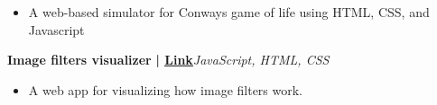 \documentclass[a4paper]{article}
\begin{document}
\begin{itemize} \itemsep -3pt
\item[] A web-based simulator for Conway\textquotesingle{}s game of life using HTML, CSS, and Javascript
\end{itemize}
          \vspace*{3mm}
      {\textbf{Image filters visualizer}}\textbf{ | \href{https://github.com/syedhuzaif199/image-filters-visualization}{\underline{Link}}}\hfill{\sl JavaScript, HTML, CSS}\\
          \vspace{-2mm}
\begin{itemize} \itemsep -3pt
\item[] A web app for visualizing how image filters work.
\end{itemize}
          \vspace*{3mm}

    \ 
    
\end{document}

